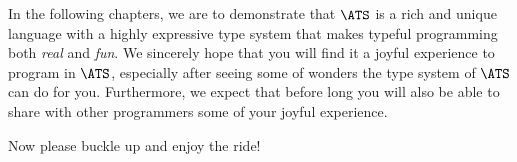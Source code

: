 In the following chapters, we are to demonstrate that $\ATS$ is a rich and
unique language with a highly expressive type system that makes typeful
programming both {\em real} and {\em fun}.  We sincerely hope that you will
find it a joyful experience to program in $\ATS$, especially after seeing
some of wonders the type system of $\ATS$ can do for you. Furthermore, we
expect that before long you will also be able to share with other
programmers some of your joyful experience.

Now please buckle up and enjoy the ride!
